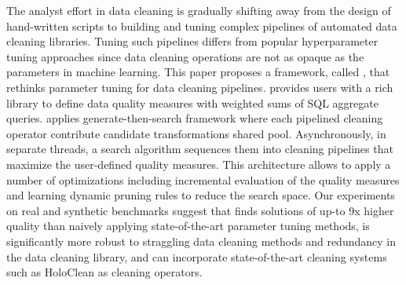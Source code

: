 \sloppy
The analyst effort in data cleaning is gradually shifting away from the design of hand-written scripts to building and tuning complex pipelines of automated data cleaning libraries.
Tuning such pipelines differs from popular hyperparameter tuning approaches since data cleaning operations are not as opaque as the parameters in machine learning. This paper proposes a framework, called \sys, that rethinks parameter tuning for data cleaning pipelines.
\sys provides users with a rich library to define data quality measures with weighted sums of SQL aggregate queries.
\sys applies generate-then-search framework where each pipelined cleaning operator contribute candidate transformations shared pool.  Asynchronously, in separate threads, a search algorithm sequences them into cleaning pipelines that maximize the user-defined quality measures.
This architecture allows \sys to apply a number of optimizations including incremental evaluation of the quality measures and learning dynamic pruning rules to reduce the search space.
Our experiments on real and synthetic benchmarks suggest that \sys finds solutions of up-to 9x higher quality than naively applying state-of-the-art parameter tuning methods, is significantly more robust to straggling data cleaning methods and redundancy in the data cleaning library, and can incorporate state-of-the-art cleaning systems such as HoloClean as cleaning operators.